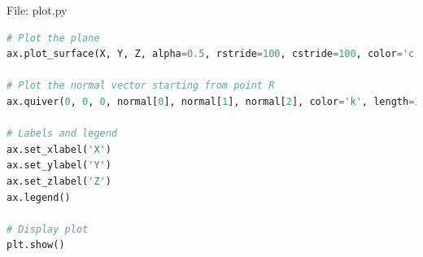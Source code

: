 \documentclass{beamer}
\numberwithin{equation}{section}
\theoremstyle{remark}
\begin{document}
\begin{frame}[fragile]{File: plot.py}
\begin{lstlisting}[language=Python]
# Plot the plane
ax.plot_surface(X, Y, Z, alpha=0.5, rstride=100, cstride=100, color='c')

# Plot the normal vector starting from point R
ax.quiver(0, 0, 0, normal[0], normal[1], normal[2], color='k', length=1, linewidth=1, label='Normal Vector')

# Labels and legend
ax.set_xlabel('X')
ax.set_ylabel('Y')
ax.set_zlabel('Z')
ax.legend()

# Display plot
plt.show()
\end{lstlisting}
\end{frame}
\end{document}

